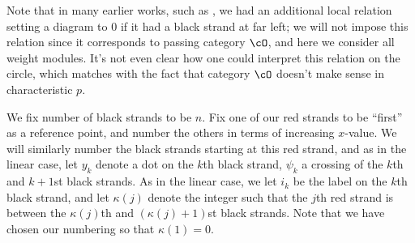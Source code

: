 \begin{remark}
Note that in many earlier works, such as \cite{Webmerged,WebRou}, we had an additional local relation setting a diagram to 0 if it had a black strand at far left; we will not impose this relation since it corresponds to passing category $\cO$, and here we consider all weight modules.  It's not even clear how one could interpret this relation on the circle, which matches with the fact that category $\cO$ doesn't make sense in characteristic $p$.  
\end{remark}
We fix number of black strands to be $n$.  Fix one of our red strands to be ``first'' as a reference point, and number the others in terms of increasing $x$-value. We will similarly number the black strands starting at this red strand, and as in the linear case, let $y_k$ denote a dot on the $k$th black strand, $\psi_k$ a crossing of the $k$th and $k+1$st black strands.  As in the linear case, we let $i_k$ be the label on the $k$th black strand, and let  $\kappa(j)$ denote the integer such that the $j$th red strand is between the $\kappa(j)$th and $(\kappa(j)+1)$st black strands.  Note that we have chosen our numbering so that $\kappa(1)=0$. 

